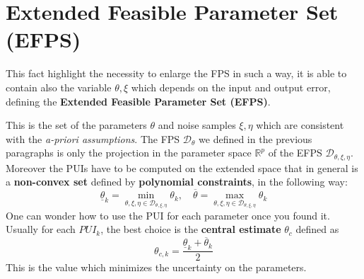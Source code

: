 \section{Extended Feasible Parameter Set (EFPS)}
\noindent
This fact highlight the necessity to enlarge the FPS in such a way, it is able to contain also the variable $\theta, \xi$ which depends on the input and output error, defining the \textbf{Extended Feasible Parameter Set (EFPS)}.\\

\hspace*{-5mm}
%

This is the set of the parameters $\theta$ and noise samples $\xi, \eta$ which are consistent with the \textit{a-priori assumptions}. The FPS $\mathcal{D}_\theta$ we defined in the previous paragraphs is only the projection in the parameter space $\mathbb{R}^p$ of the EFPS $\mathcal{D}_{\theta,\xi,\eta}$.
Moreover the PUIs have to be computed on the extended space that in general is a \textbf{non-convex set} defined by \textbf{polynomial constraints}, in the following way:
{\large{
    \begin{equation}
        \underline{\theta}_k=\min_
        {\theta,\xi,\eta\in\mathcal{D_{\theta,\xi,\eta}}} {\theta_k}, \quad \overline{\theta}=\max_{\theta,\xi,\eta\in\mathcal{D_{\theta,\xi,\eta}}} {\theta_k} \label{eq:PUIs}
    \end{equation}
}}
One can wonder how to use the PUI for each parameter once you found it.  Usually for each $PUI_k$, the best choice is the \textbf{central estimate} $\theta_c$ defined as
\begin{equation*}
    \theta_{c,k} = \frac{\underline{\theta}_k+\overline{\theta}_k}{2}
\end{equation*}
This is the value which minimizes the uncertainty on the parameters.

